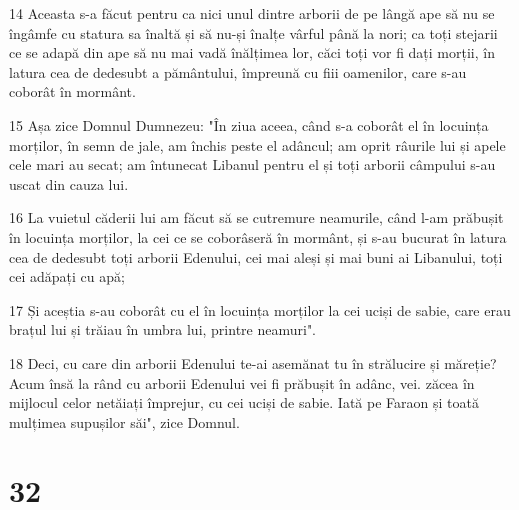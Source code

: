 \par 14 Aceasta s-a făcut pentru ca nici unul dintre arborii de pe lângă ape să nu se îngâmfe cu statura sa înaltă și să nu-și înalțe vârful până la nori; ca toți stejarii ce se adapă din ape să nu mai vadă înălțimea lor, căci toți vor fi dați morții, în latura cea de dedesubt a pământului, împreună cu fiii oamenilor, care s-au coborât în mormânt.
\par 15 Așa zice Domnul Dumnezeu: "În ziua aceea, când s-a coborât el în locuința morților, în semn de jale, am închis peste el adâncul; am oprit râurile lui și apele cele mari au secat; am întunecat Libanul pentru el și toți arborii câmpului s-au uscat din cauza lui.
\par 16 La vuietul căderii lui am făcut să se cutremure neamurile, când l-am prăbușit în locuința morților, la cei ce se coborâseră în mormânt, și s-au bucurat în latura cea de dedesubt toți arborii Edenului, cei mai aleși și mai buni ai Libanului, toți cei adăpați cu apă;
\par 17 Și aceștia s-au coborât cu el în locuința morților la cei uciși de sabie, care erau brațul lui și trăiau în umbra lui, printre neamuri".
\par 18 Deci, cu care din arborii Edenului te-ai asemănat tu în strălucire și măreție? Acum însă la rând cu arborii Edenului vei fi prăbușit în adânc, vei. zăcea în mijlocul celor netăiați împrejur, cu cei uciși de sabie. Iată pe Faraon și toată mulțimea supușilor săi", zice Domnul.

\chapter{32}

